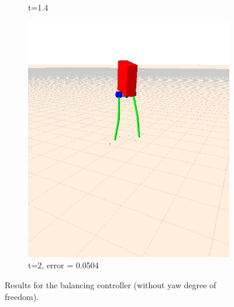 \documentclass[letterpaper, 10 pt, conference]{ieeeconf}  %
\begin{document}
\begin{figure}[tbp]
\begin{subfigure}[b]{0.3\textwidth}
    \caption{t=1.4}
    \label{fig:balanceNoYaw2}
  \end{subfigure}\hfill
  \begin{subfigure}[b]{0.3\textwidth}
    \centering
    \includegraphics[width=\textwidth] {figures/balanceNoYaw3.jpg} 
    \caption{t=2, error = 0.0504}
    \label{fig:balanceNoYaw3}
  \end{subfigure}
  \caption{Results for the balancing controller (without yaw degree of freedom).}
  \label{fig:balancing}
\end{figure}
\end{document}
